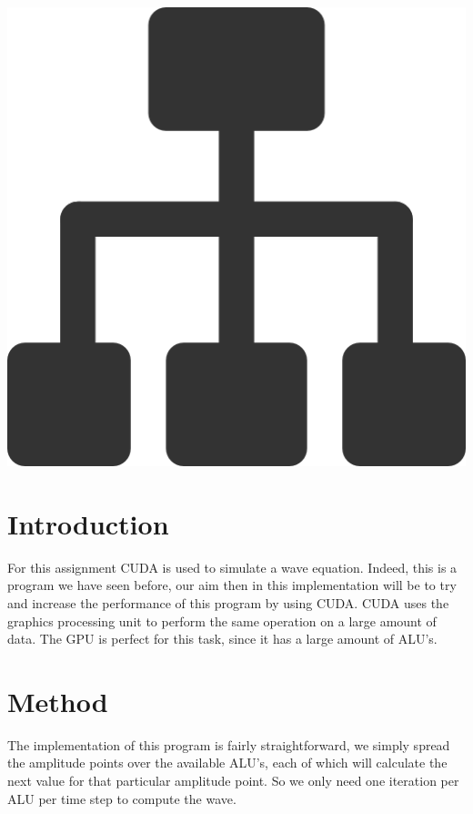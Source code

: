 \documentclass[a4paper,12px]{article}
\begin{document}
\vspace{2cm}
\begin{center}
    \includegraphics[width=(\textwidth/5*3)]{parallel_tasks}
\end{center}
\clearpage

\tableofcontents
\vspace{5mm}


\section{Introduction}

For this assignment CUDA is used to simulate a wave equation. Indeed, this is a
program we have seen before, our aim then in this implementation will be to try
and increase the performance of this program by using CUDA.
CUDA uses the graphics processing unit to perform the same operation on a large
amount of data. The GPU is perfect for this task, since it has a large amount of
ALU's.

\section{Method}

The implementation of this program is fairly straightforward, we simply spread
the amplitude points over the available ALU's, each of which will calculate the
next value for that particular amplitude point. So we only need one iteration
per ALU per time step to compute the wave.
\end{document}
